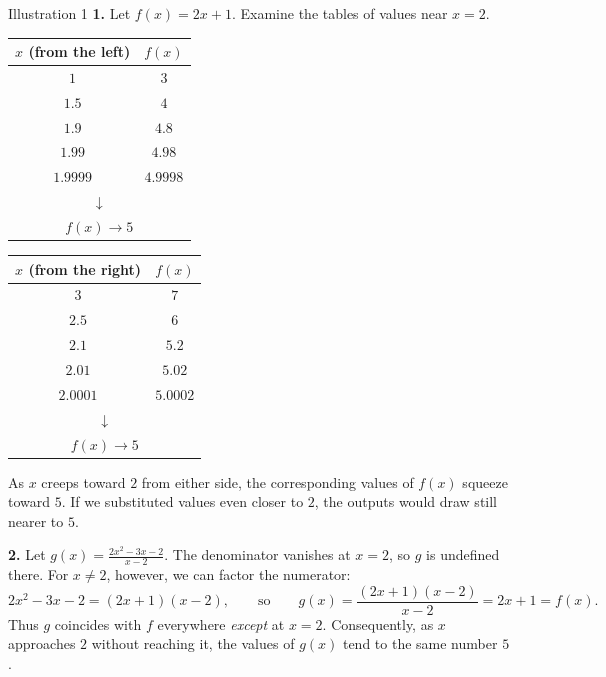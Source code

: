 \begin{examplebox}{Illustration 1}
\textbf{1.} Let \(f(x) = 2x + 1\).  Examine the tables of values near \(x = 2\).

\medskip
\small
\begin{minipage}{0.46\textwidth}
\centering
\begin{tabular}{c|c}
\(x\) (from the left) & \(f(x)\) \\
\hline
\(1\)      & \(3\) \\
\(1.5\)    & \(4\) \\
\(1.9\)    & \(4.8\) \\
\(1.99\)   & \(4.98\) \\
\(1.9999\) & \(4.9998\) \\
\multicolumn{2}{c}{\(\downarrow\)} \\
\multicolumn{2}{c}{\(f(x) \to 5\)}
\end{tabular}
\end{minipage}
\hfill
\begin{minipage}{0.46\textwidth}
\centering
\begin{tabular}{c|c}
\(x\) (from the right) & \(f(x)\) \\
\hline
\(3\)      & \(7\) \\
\(2.5\)    & \(6\) \\
\(2.1\)    & \(5.2\) \\
\(2.01\)   & \(5.02\) \\
\(2.0001\) & \(5.0002\) \\
\multicolumn{2}{c}{\(\downarrow\)} \\
\multicolumn{2}{c}{\(f(x) \to 5\)}
\end{tabular}
\end{minipage}
\normalsize

\medskip
As \(x\) creeps toward \(2\) from either side, the corresponding values of \(f(x)\) squeeze toward \(5\).  If we substituted values even closer to \(2\), the outputs would draw still nearer to \(5\).

\medskip
\textbf{2.} Let \(\displaystyle g(x) = \frac{2x^{2} - 3x - 2}{x - 2}\).  The denominator vanishes at \(x = 2\), so \(g\) is undefined there.  For \(x \neq 2\), however, we can factor the numerator:
\[
2x^{2} - 3x - 2 = (2x + 1)(x - 2),
\qquad\text{so}\qquad
g(x) = \frac{(2x + 1)(x - 2)}{x - 2} = 2x + 1 = f(x).
\]
Thus \(g\) coincides with \(f\) everywhere \emph{except} at \(x = 2\).  Consequently, as \(x\) approaches \(2\) without reaching it, the values of \(g(x)\) tend to the same number \(5\).


\end{examplebox}
